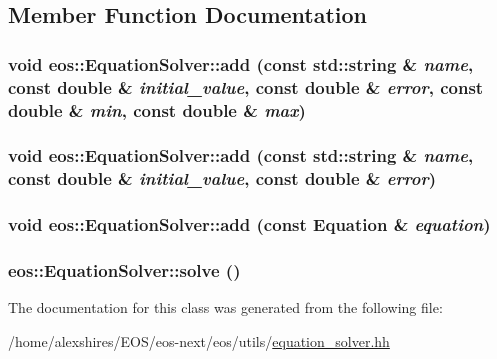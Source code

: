 \subsection{Member Function Documentation}
\hypertarget{classeos_1_1EquationSolver_a616986b11e89a331af2b21a1fe8f3ce2}{
\subsubsection[{add}]{\setlength{\rightskip}{0pt plus 5cm}void eos::EquationSolver::add (const std::string \& {\em name}, \/  const double \& {\em initial\_\-value}, \/  const double \& {\em error}, \/  const double \& {\em min}, \/  const double \& {\em max})}}
\label{classeos_1_1EquationSolver_a616986b11e89a331af2b21a1fe8f3ce2}
\hypertarget{classeos_1_1EquationSolver_ad6d72a4680c5c5f6bea52fc25faa931f}{
\subsubsection[{add}]{\setlength{\rightskip}{0pt plus 5cm}void eos::EquationSolver::add (const std::string \& {\em name}, \/  const double \& {\em initial\_\-value}, \/  const double \& {\em error})}}
\label{classeos_1_1EquationSolver_ad6d72a4680c5c5f6bea52fc25faa931f}
\hypertarget{classeos_1_1EquationSolver_ad9cc623f54250dca0cc3fd288dcede77}{
\subsubsection[{add}]{\setlength{\rightskip}{0pt plus 5cm}void eos::EquationSolver::add (const {\bf Equation} \& {\em equation})}}
\label{classeos_1_1EquationSolver_ad9cc623f54250dca0cc3fd288dcede77}
\hypertarget{classeos_1_1EquationSolver_ad9add1a035d5edff206361db0d050a44}{
\subsubsection[{solve}]{ eos::EquationSolver::solve ()}}
\label{classeos_1_1EquationSolver_ad9add1a035d5edff206361db0d050a44}


The documentation for this class was generated from the following file:\begin{DoxyCompactItemize}
\item 
/home/alexshires/EOS/eos-\/next/eos/utils/\hyperlink{equation__solver_8hh}{equation\_\-solver.hh}\end{DoxyCompactItemize}
